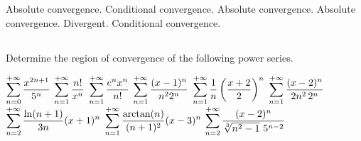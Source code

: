 \begin{Answer}
    \begin{multicols}{2}

    \Question Absolute convergence. 
    \Question Conditional convergence. 
    \Question Absolute convergence. 
    \Question Absolute convergence. 
    \Question Divergent. 
    \Question Conditional convergence. 
    \EndCurrentQuestion
    \end{multicols}
\end{Answer}


\pagebreak
\subsection*{}
\begin{Exercise} Determine the  region of convergence of the following power series.
\begin{multicols}{2}
    \Question[difficulty = 1] $\displaystyle\sum_{n=0}^{+\infty} \dfrac{x^{2n+1}}{5^n} $
    \Question[difficulty = 2] $\displaystyle\sum_{n=1}^{+\infty} \dfrac{n!}{x^n} $ 
    \Question[difficulty = 2] $\displaystyle\sum_{n=1}^{+\infty} \dfrac{e^n x^n}{n!} $ 
    \Question[difficulty = 2] $\displaystyle\sum_{n=1}^{+\infty} \dfrac{(x-1)^n}{n^2 2^n} $
    \Question[difficulty = 2] $ \displaystyle\sum_{n=1}^{+\infty} \dfrac{1}{n} \left( \frac{x+2}{2} \right)^n$
    \Question[difficulty = 2] $\displaystyle\sum_{n=1}^{+\infty} \dfrac{(x-2)^{n}}{2 n^2\, 2^n}$
    \Question[difficulty = 3] $\displaystyle\sum_{n=2}^{+\infty} \dfrac{\ln (n+1) }{3n} (x+1)^{n}$
    \Question[difficulty = 3] $\displaystyle\sum_{n=1}^{+\infty} \dfrac{\arctan (n)}{(n+1)^2}(x-3)^n $ 
    \Question[difficulty = 3] $\displaystyle\sum_{n=2}^{+\infty} \dfrac{(x-2)^n}{\sqrt[3]{n^2-1} \   5^{n-2}} $ 
    \EndCurrentQuestion
\end{multicols}
\end{Exercise}

